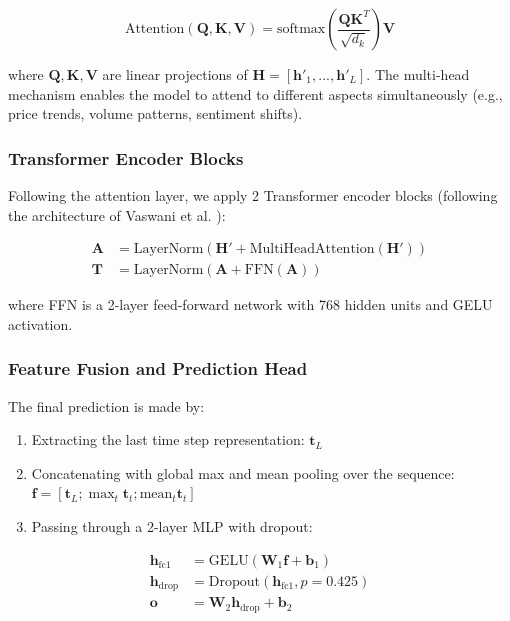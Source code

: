 \documentclass[conference]{IEEEtran}
\begin{document}
\begin{equation}
\text{Attention}(\mathbf{Q}, \mathbf{K}, \mathbf{V}) = \text{softmax}\left(\frac{\mathbf{Q}\mathbf{K}^T}{\sqrt{d_k}}\right)\mathbf{V}
\end{equation}

where $\mathbf{Q}, \mathbf{K}, \mathbf{V}$ are linear projections of $\mathbf{H} = [\mathbf{h}'_1, ..., \mathbf{h}'_L]$. The multi-head mechanism enables the model to attend to different aspects simultaneously (e.g., price trends, volume patterns, sentiment shifts).

\subsubsection{Transformer Encoder Blocks}
Following the attention layer, we apply 2 Transformer encoder blocks (following the architecture of Vaswani et al. \cite{vaswani2017attention}):

\begin{equation}
\begin{aligned}
\mathbf{A} &= \text{LayerNorm}(\mathbf{H}' + \text{MultiHeadAttention}(\mathbf{H}')) \\
\mathbf{T} &= \text{LayerNorm}(\mathbf{A} + \text{FFN}(\mathbf{A}))
\end{aligned}
\end{equation}

where FFN is a 2-layer feed-forward network with 768 hidden units and GELU activation.

\subsubsection{Feature Fusion and Prediction Head}
The final prediction is made by:

\begin{enumerate}
\item Extracting the last time step representation: $\mathbf{t}_L$
\item Concatenating with global max and mean pooling over the sequence: $\mathbf{f} = [\mathbf{t}_L; \max_t \mathbf{t}_t; \text{mean}_t \mathbf{t}_t]$
\item Passing through a 2-layer MLP with dropout:
\end{enumerate}

\begin{equation}
\begin{aligned}
\mathbf{h}_{\text{fc1}} &= \text{GELU}(\mathbf{W}_1 \mathbf{f} + \mathbf{b}_1) \\
\mathbf{h}_{\text{drop}} &= \text{Dropout}(\mathbf{h}_{\text{fc1}}, p=0.425) \\
\mathbf{o} &= \mathbf{W}_2 \mathbf{h}_{\text{drop}} + \mathbf{b}_2
\end{aligned}
\end{equation}
\end{document}
